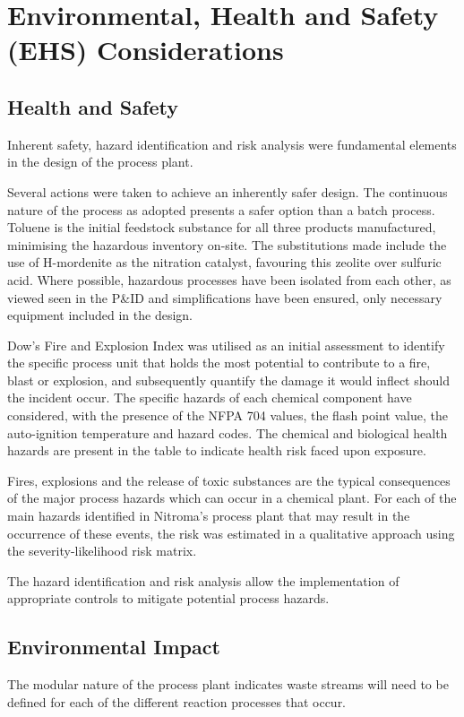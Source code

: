 \section{Environmental, Health and Safety (EHS) Considerations}
\label{sec:ehs}
\subsection{Health and Safety}

Inherent safety, hazard identification and risk analysis were fundamental elements in the design of the process plant. 

Several actions were taken to achieve an inherently safer design. The continuous nature of the process as adopted presents a safer option than a batch process. Toluene is the initial feedstock substance for all three products manufactured, minimising the hazardous inventory on-site. The substitutions made include the use of H-mordenite as the nitration catalyst, favouring this zeolite over sulfuric acid. Where possible, hazardous processes have been isolated from each other, as viewed seen in the P&ID and simplifications have been ensured, only necessary equipment included in the design. 

Dow's Fire and Explosion Index was utilised as an initial assessment to identify the specific process unit that holds the most potential to contribute to a fire, blast or explosion, and subsequently quantify the damage it would inflect should the incident occur. The specific hazards of each chemical component have considered, with the presence of the NFPA 704 values, the flash point value, the auto-ignition temperature and hazard codes. The chemical and biological health hazards are present in the table to indicate health risk faced upon exposure.  

Fires, explosions and the release of toxic substances are the typical consequences of the major process hazards which can occur in a chemical plant. For each of the main hazards identified in Nitroma's process plant that may result in the occurrence of these events, the risk was estimated in a qualitative approach using the severity-likelihood risk matrix. 

The hazard identification and risk analysis allow the implementation of appropriate controls to mitigate potential process hazards. 


\subsection{Environmental Impact}

The modular nature of the process plant indicates waste streams will need to be defined for each of the different reaction processes that occur.  